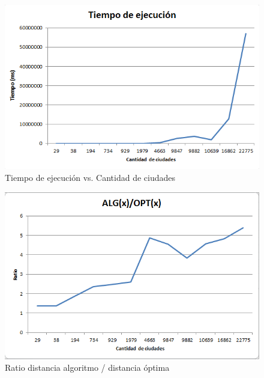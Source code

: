 \documentclass[12pt,letterpaper, margin = 3cm]{article}
\begin{document}
 \begin{figure}[ht!]
 \centering
 \includegraphics[scale=0.7]{img/timeclosest.png}
 \caption{Tiempo de ejecución vs. Cantidad de ciudades}
 \end{figure}
 
  \begin{figure}[ht!]
 \centering
 \includegraphics[scale=0.7]{img/ratioclosest.png}
 \caption{Ratio distancia algoritmo / distancia óptima}
 \end{figure}


\newpage
\end{document}
